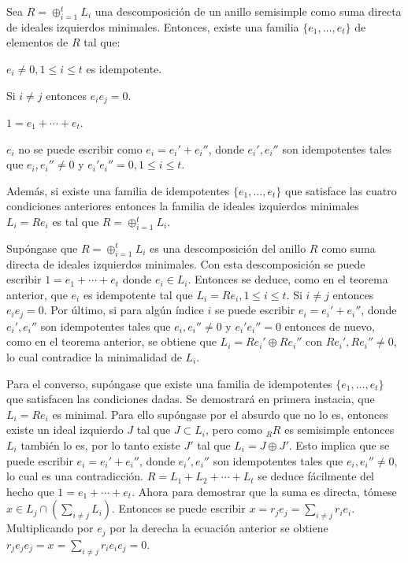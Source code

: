 \begin{teorema}\label{teo:familiaIdempotentes}
Sea $R = \oplus_{i = 1}^t L_i$ una descomposición de un anillo semisimple como suma directa de ideales izquierdos minimales. Entonces, existe una familia $\{e_1, \dots, e_t \}$ de elementos de $R$ tal que:
\begin{bulletList}
\item\label{item:orto1} $e_i \neq 0, 1 \leq i \leq t$ es idempotente.
\item\label{item:orto2} Si $i \neq j$ entonces $e_ie_j = 0$.
\item\label{item:orto3} $1 = e_1 + \cdots + e_t$.
\item\label{item:orto4} $e_i$ no se puede escribir como $e_i = e_i'+ e_i''$, donde $e_i', e_i''$ son idempotentes tales que $e_i, e_i'' \neq 0$ y $e_i'e_i''=0, 1\leq i \leq t$.
\end{bulletList}
Además, si existe una familia de idempotentes $\{e_1, \dots, e_t \}$ que satisface las cuatro condiciones anteriores entonces la familia de ideales izquierdos minimales $L_i = Re_i$ es tal que $R = \oplus_{i=1}^tL_i$.
\end{teorema}
\begin{proof*}
Supóngase que $R = \oplus_{i = 1}^tL_i$ es una descomposición del anillo $R$ como suma directa de ideales izquierdos minimales. Con esta descomposición se puede escribir $1 = e_1 + \cdots + e_t$ donde $e_i \in L_i$. Entonces se deduce, como en el teorema anterior, que $e_i$ es idempotente tal que $L_i = Re_i, 1 \leq i \leq t$. Si $i \neq j$ entonces $e_ie_j = 0$. Por último, si para algún índice $i$ se puede escribir $e_i = e_i'+ e_i''$, donde $e_i', e_i''$ son idempotentes tales que $e_i, e_i'' \neq 0$ y $e_i'e_i''=0$ entonces de nuevo, como en el teorema anterior, se obtiene que $L_i = Re_i'\oplus Re_i''$ con $Re_i', Re_i'' \neq 0$, lo cual contradice la minimalidad de $L_i$. 

Para el converso, supóngase que existe una familia de idempotentes $\{ e_1, \dots, e_t \}$ que satisfacen las condiciones dadas. Se demostrará en primera instacia, que $L_i = Re_i$ es minimal. Para ello supóngase por el absurdo que no lo es, entonces existe un ideal izquierdo $J$ tal que $J \subset L_i$, pero como $_RR$ es semisimple entonces $L_i$ también lo es, por lo tanto existe $J'$ tal que $L_i = J\oplus J'$. Esto implica que se puede escribir $e_i = e_i'+ e_i''$, donde $e_i', e_i''$ son idempotentes tales que $e_i, e_i'' \neq 0$, lo cual es una contradicción.
$R = L_1 + L_2 + \cdots + L_t$ se deduce fácilmente del hecho que $1 = e_1 + \cdots + e_t$. Ahora para demostrar que la suma es directa, tómese $x \in L_j \cap \left( \sum_{i \neq j}L_i \right)$. Entonces se puede escribir $x = r_je_j = \sum_{i \neq j}r_ie_i$. Multiplicando por $e_j$ por la derecha la ecuación anterior se obtiene $r_je_je_j = x = \sum_{i \neq j}r_ie_ie_j = 0$.
\end{proof*}

